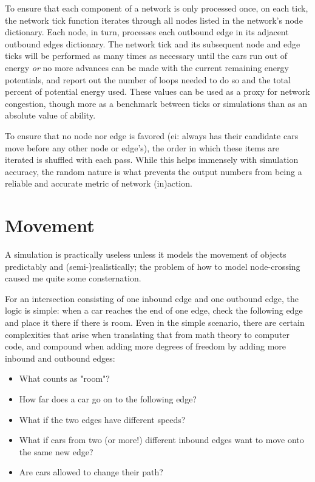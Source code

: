 \par To ensure that each component of a network is only processed once, on each tick, the network tick function iterates through all nodes listed in the network's node dictionary.  Each node, in turn, processes each outbound edge in its adjacent outbound edges dictionary.  The network tick and its subsequent node and edge ticks will be performed as many times as necessary until the cars run out of energy \textit{or} no more advances can be made with the current remaining energy potentials, and report out the number of loops needed to do so and the total percent of potential energy used.  These values can be used as a proxy for network congestion, though more as a benchmark between ticks or simulations than as an absolute value of ability. \\

\par To ensure that no node nor edge is favored (ei: always has their candidate cars move before any other node or edge's), the order in which these items are iterated is shuffled with each pass.  While this helps immensely with simulation accuracy, the random nature is what prevents the output numbers from being a reliable and accurate metric of network (in)action. 


\section{Movement}

\par A simulation is practically useless unless it models the movement of objects predictably and (semi-)realistically; the problem of how to model node-crossing caused me quite some consternation. \\

\par  For an intersection consisting of one inbound edge and one outbound edge, the logic is simple:  when a car reaches the end of one edge, check the following edge and place it there if there is room.  Even in the simple scenario, there are certain complexities that arise when translating that from math theory to computer code, and compound when adding more degrees of freedom by adding more inbound and outbound edges: 

\begin{itemize}
    \item What counts as "room"?
    \item How far does a car go on to the following edge?
    \item What if the two edges have different speeds?
    \item What if cars from two (or more!) different inbound edges want to move onto the same new edge?
    \item Are cars allowed to change their path?
\end{itemize}

